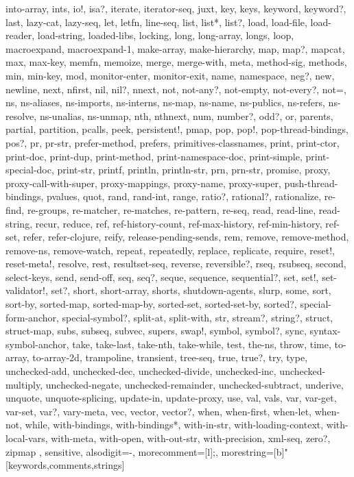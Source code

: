 {{into-array,
ints,
io!,
isa?,
iterate,
iterator-seq,
juxt,
key,
keys,
keyword,
keyword?,
last,
lazy-cat,
lazy-seq,
let,
letfn,
line-seq,
list,
list*,
list?,
load,
load-file,
load-reader,
load-string,
loaded-libs,
locking,
long,
long-array,
longs,
loop,
macroexpand,
macroexpand-1,
make-array,
make-hierarchy,
map,
map?,
mapcat,
max,
max-key,
memfn,
memoize,
merge,
merge-with,
meta,
method-sig,
methods,
min,
min-key,
mod,
monitor-enter,
monitor-exit,
name,
namespace,
neg?,
new,
newline,
next,
nfirst,
nil,
nil?,
nnext,
not,
not-any?,
not-empty,
not-every?,
not=,
ns,
ns-aliases,
ns-imports,
ns-interns,
ns-map,
ns-name,
ns-publics,
ns-refers,
ns-resolve,
ns-unalias,
ns-unmap,
nth,
nthnext,
num,
number?,
odd?,
or,
parents,
partial,
partition,
pcalls,
peek,
persistent!,
pmap,
pop,
pop!,
pop-thread-bindings,
pos?,
pr,
pr-str,
prefer-method,
prefers,
primitives-classnames,
print,
print-ctor,
print-doc,
print-dup,
print-method,
print-namespace-doc,
print-simple,
print-special-doc,
print-str,
printf,
println,
println-str,
prn,
prn-str,
promise,
proxy,
proxy-call-with-super,
proxy-mappings,
proxy-name,
proxy-super,
push-thread-bindings,
pvalues,
quot,
rand,
rand-int,
range,
ratio?,
rational?,
rationalize,
re-find,
re-groups,
re-matcher,
re-matches,
re-pattern,
re-seq,
read,
read-line,
read-string,
recur,
reduce,
ref,
ref-history-count,
ref-max-history,
ref-min-history,
ref-set,
refer,
refer-clojure,
reify,
release-pending-sends,
rem,
remove,
remove-method,
remove-ns,
remove-watch,
repeat,
repeatedly,
replace,
replicate,
require,
reset!,
reset-meta!,
resolve,
rest,
resultset-seq,
reverse,
reversible?,
rseq,
rsubseq,
second,
select-keys,
send,
send-off,
seq,
seq?,
seque,
sequence,
sequential?,
set,
set!,
set-validator!,
set?,
short,
short-array,
shorts,
shutdown-agents,
slurp,
some,
sort,
sort-by,
sorted-map,
sorted-map-by,
sorted-set,
sorted-set-by,
sorted?,
special-form-anchor,
special-symbol?,
split-at,
split-with,
str,
stream?,
string?,
struct,
struct-map,
subs,
subseq,
subvec,
supers,
swap!,
symbol,
symbol?,
sync,
syntax-symbol-anchor,
take,
take-last,
take-nth,
take-while,
test,
the-ns,
throw,
time,
to-array,
to-array-2d,
trampoline,
transient,
tree-seq,
true,
true?,
try,
type,
unchecked-add,
unchecked-dec,
unchecked-divide,
unchecked-inc,
unchecked-multiply,
unchecked-negate,
unchecked-remainder,
unchecked-subtract,
underive,
unquote,
unquote-splicing,
update-in,
update-proxy,
use,
val,
vals,
var,
var-get,
var-set,
var?,
vary-meta,
vec,
vector,
vector?,
when,
when-first,
when-let,
when-not,
while,
with-bindings,
with-bindings*,
with-in-str,
with-loading-context,
with-local-vars,
with-meta,
with-open,
with-out-str,
with-precision,
xml-seq,
zero?,
zipmap
},
sensitive,
alsodigit=-,
morecomment=[l];,
morestring=[b]"
}[keywords,comments,strings]


